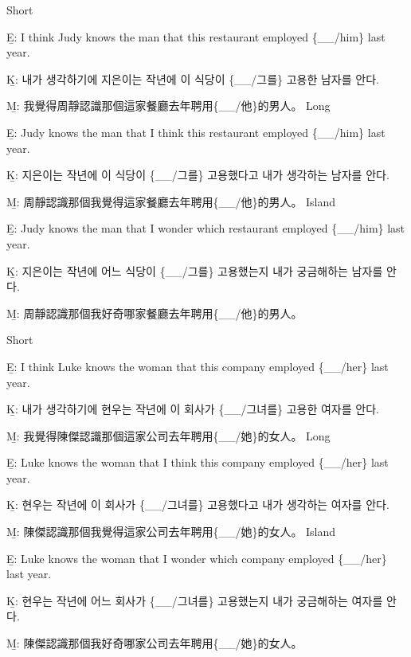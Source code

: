 \pex %
\a Short\par\nobreak
\beginsubsub
\b{E:} I think Judy knows the man that this restaurant employed \{\_\_/him\} last year.\par\nobreak
\b{K:} \ko 내가 생각하기에 지은이는 작년에 이 식당이 \{\_\_/그를\} 고용한 남자를 안다. \normalfont\par\nobreak
\b{M:} \zh 我覺得周靜認識那個這家餐廳去年聘用\{\_\_/他\}的男人。 \normalfont
\endsubsub
\a Long\par\nobreak
\beginsubsub
\b{E:} Judy knows the man that I think this restaurant employed \{\_\_/him\} last year.\par\nobreak
\b{K:} \ko 지은이는 작년에 이 식당이 \{\_\_/그를\} 고용했다고 내가 생각하는 남자를 안다. \normalfont\par\nobreak
\b{M:} \zh 周靜認識那個我覺得這家餐廳去年聘用\{\_\_/他\}的男人。 \normalfont
\endsubsub
\a Island\par\nobreak
\beginsubsub
\b{E:} Judy knows the man that I wonder which restaurant employed \{\_\_/him\} last year.\par\nobreak
\b{K:} \ko 지은이는 작년에 어느 식당이 \{\_\_/그를\} 고용했는지 내가 궁금해하는 남자를 안다\normalfont.\par\nobreak
\b{M:} \zh 周靜認識那個我好奇哪家餐廳去年聘用\{\_\_/他\}的男人。\normalfont
\endsubsub
\xe

\pex %
\a Short\par\nobreak
\beginsubsub
\b{E:} I think Luke knows the woman that this company employed \{\_\_/her\} last year.\par\nobreak
\b{K:} \ko 내가 생각하기에 현우는 작년에 이 회사가 \{\_\_/그녀를\} 고용한 여자를 안다. \normalfont\par\nobreak
\b{M:} \zh 我覺得陳傑認識那個這家公司去年聘用\{\_\_/她\}的女人。 \normalfont
\endsubsub
\a Long\par\nobreak
\beginsubsub
\b{E:} Luke knows the woman that I think this company employed \{\_\_/her\} last year.\par\nobreak
\b{K:} \ko 현우는 작년에 이 회사가 \{\_\_/그녀를\} 고용했다고 내가 생각하는 여자를 안다. \normalfont\par\nobreak
\b{M:} \zh 陳傑認識那個我覺得這家公司去年聘用\{\_\_/她\}的女人。\normalfont
\endsubsub
\a Island\par\nobreak
\beginsubsub
\b{E:} Luke knows the woman that I wonder which company employed \{\_\_/her\} last year.\par\nobreak
\b{K:} \ko 현우는 작년에 어느 회사가 \{\_\_/그녀를\} 고용했는지 내가 궁금해하는 여자를 안다\normalfont.\par\nobreak
\b{M:} \zh 陳傑認識那個我好奇哪家公司去年聘用\{\_\_/她\}的女人。\normalfont
\endsubsub
\xe

